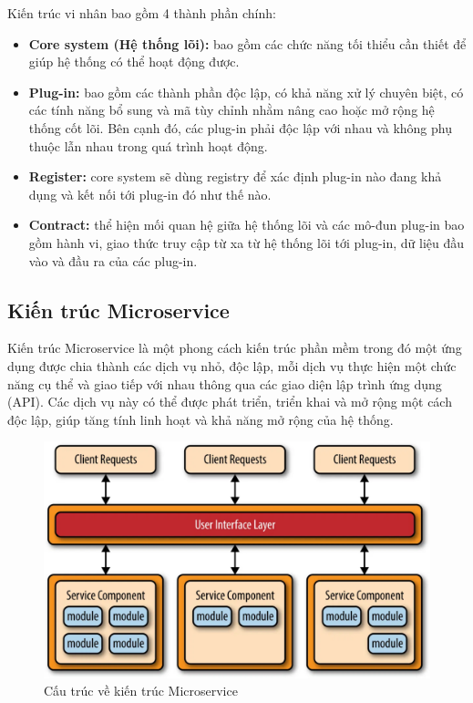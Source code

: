 Kiến trúc vi nhân bao gồm 4 thành phần chính:
\begin{itemize}
    \item \textbf{Core system (Hệ thống lõi):} bao gồm các chức năng tối thiểu cần thiết để giúp hệ thống có thể hoạt động được.
    \item \textbf{Plug-in:} bao gồm các thành phần độc lập, có khả năng xử lý chuyên biệt, có các tính năng bổ sung và mã tùy chỉnh nhằm nâng cao hoặc mở rộng hệ thống cốt lõi. Bên cạnh đó, các plug-in phải độc lập với nhau và không phụ thuộc lẫn nhau trong quá trình hoạt động.
    \item \textbf{Register:} core system sẽ dùng registry để xác định plug-in nào đang khả dụng và kết nối tới plug-in đó như thế nào.
    \item \textbf{Contract:} thể hiện mối quan hệ giữa hệ thống lõi và các mô-đun plug-in bao gồm hành vi, giao thức truy cập từ xa từ hệ thống lõi tới plug-in, dữ liệu đầu vào và đầu ra của các plug-in.
\end{itemize}

\subsection{Kiến trúc Microservice}

Kiến trúc Microservice là một phong cách kiến trúc phần mềm trong đó một ứng dụng được chia thành các dịch vụ nhỏ, độc lập, mỗi dịch vụ thực hiện một chức năng cụ thể và giao tiếp với nhau thông qua các giao diện lập trình ứng dụng (API). Các dịch vụ này có thể được phát triển, triển khai và mở rộng một cách độc lập, giúp tăng tính linh hoạt và khả năng mở rộng của hệ thống.


\begin{figure}[H]

	\centering
    \includegraphics[scale = 0.25]{img/Microservice_Architecture.png}
    \caption{Cấu trúc về kiến trúc Microservice}
\end{figure}

